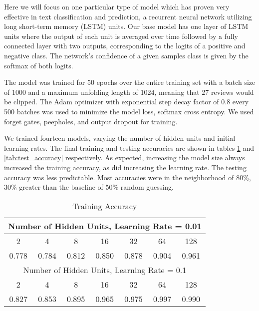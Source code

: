 \label{sec:rnn_results}
Here we will focus on one particular type of model which has proven very effective in text classification and prediction, a recurrent neural network utilizing long short-term memory (LSTM) units.  Our base model has one layer of LSTM units where the output of each unit is averaged over time followed by a fully connected layer with two outputs, corresponding to the logits of a positive and negative class.  The network's confidence of a given samples class is given by the softmax of both logits.  

The model was trained for 50 epochs over the entire training set with a batch size of 1000 and a maximum unfolding length of 1024, meaning that 27 reviews would be clipped.  The Adam optimizer with exponential step decay factor of 0.8 every 500 batches was used to minimize the model loss, softmax cross entropy.  We used forget gates, peepholes, and output dropout for training.  

We trained fourteen models, varying the number of hidden units and initial learning rates.  The final training and testing accuracies are shown in tables \ref{tab:train_accuracy} and \ref{tab:test_accuracy} respectively.  As expected, increasing the model size always increased the training accuracy, as did increasing the learning rate.  The testing accuracy was less predictable.  Most accuracies were in the neighborhood of 80\%, 30\% greater than the baseline of 50\% random guessing.

\begin{table}
\centering
\begin{tabular}{ |c|c|c|c|c|c|c|}
    \hline
    \multicolumn{7}{|c|}{Number of Hidden Units, Learning Rate = 0.01}\\ \hline
    2 & 4 & 8 & 16 & 32 & 64 & 128 \\ \hline
    0.778 & 0.784 & 0.812 & 0.850 & 0.878 & 0.904 & 0.961 \\ \hline
    \multicolumn{7}{|c|}{Number of Hidden Units, Learning Rate = 0.1}\\ \hline
    2 & 4 & 8 & 16 & 32 & 64 & 128 \\ \hline
    0.827 & 0.853 & 0.895 & 0.965 & 0.975 & 0.997 & 0.990 \\ \hline
\end{tabular}
\caption{Training Accuracy}
\label{tab:train_accuracy}
\end{table}

